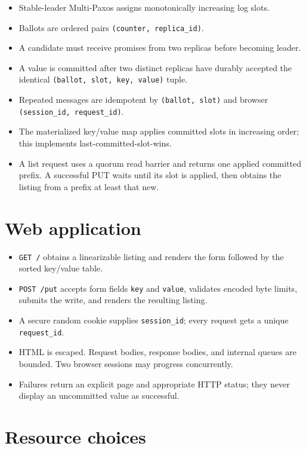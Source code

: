 \begin{itemize}
\tightlist
\item
  Stable-leader Multi-Paxos assigns monotonically increasing log slots.
\item
  Ballots are ordered pairs \texttt{(counter,\ replica\_id)}.
\item
  A candidate must receive promises from two replicas before becoming
  leader.
\item
  A value is committed after two distinct replicas have durably accepted
  the identical \texttt{(ballot,\ slot,\ key,\ value)} tuple.
\item
  Repeated messages are idempotent by \texttt{(ballot,\ slot)} and
  browser \texttt{(session\_id,\ request\_id)}.
\item
  The materialized key/value map applies committed slots in increasing
  order; this implements last-committed-slot-wins.
\item
  A list request uses a quorum read barrier and returns one applied
  committed prefix. A successful PUT waits until its slot is applied,
  then obtains the listing from a prefix at least that new.
\end{itemize}

\hypertarget{web-application}{%
\section{Web application}\label{web-application}}

\begin{itemize}
\tightlist
\item
  \texttt{GET\ /} obtains a linearizable listing and renders the form
  followed by the sorted key/value table.
\item
  \texttt{POST\ /put} accepts form fields \texttt{key} and
  \texttt{value}, validates encoded byte limits, submits the write, and
  renders the resulting listing.
\item
  A secure random cookie supplies \texttt{session\_id}; every request
  gets a unique \texttt{request\_id}.
\item
  HTML is escaped. Request bodies, response bodies, and internal queues
  are bounded. Two browser sessions may progress concurrently.
\item
  Failures return an explicit page and appropriate HTTP status; they
  never display an uncommitted value as successful.
\end{itemize}

\hypertarget{resource-choices}{%
\section{Resource choices}\label{resource-choices}}

